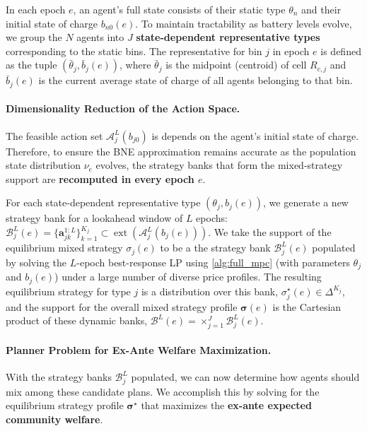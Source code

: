 \documentclass[12pt, notitlepage]{article}
\begin{document}
In each epoch $e$, an agent's full state consists of their static type $\theta_n$ and their initial state of charge $b_{n0}(e)$. To maintain tractability as battery levels evolve, we group the $N$ agents into $J$ \textbf{state-dependent representative types} corresponding to the static bins. The representative for bin $j$ in epoch $e$ is defined as the tuple $(\bar{\theta}_j, \bar{b}_j(e))$, where $\bar{\theta}_j$ is the midpoint (centroid) of cell $R_{c,j}$ and $\bar{b}_j(e)$ is the current average state of charge of all agents belonging to that bin.

\paragraph{Dimensionality Reduction of the Action Space.}
The feasible action set $\mathcal{A}_j^L(b_{j0})$ is depends on the agent's initial state of charge. Therefore, to ensure the BNE approximation remains accurate as the population state distribution $\nu_e$ evolves, the strategy banks that form the mixed-strategy support are \textbf{recomputed in every epoch $e$}. 

For each state-dependent representative type $(\theta_j, b_j(e))$, we generate a new strategy bank for a lookahead window of $L$ epochs: $\mathcal{B}_j^L(e) = \{\mathbf{a}_{jk}^{1:L}\}_{k=1}^{K_j} \subset \operatorname{ext}(\mathcal{A}_j^L(b_j(e)))$.
We take the support of the equilibrium mixed strategy $\sigma_j(e)$ to be a the strategy bank $\mathcal{B}_j^L(e)$ populated by solving the $L$-epoch best-response LP using \cref{alg:full_mpc} (with parameters $\theta_j$ and $b_j(e)$) under a large number of diverse price profiles. The resulting equilibrium strategy for type $j$ is a distribution over this bank, $\sigma_j^\star(e) \in \varDelta^{K_j}$, and the support for the overall mixed strategy profile $\boldsymbol{\sigma}(e)$ is the Cartesian product of these dynamic banks, $\mathcal{B}^L(e) = \times_{j=1}^J \mathcal{B}_j^L(e)$.



\paragraph{Planner Problem for Ex-Ante Welfare Maximization.}
With the strategy banks $\mathcal{B}_j^L$ populated, we can now determine how agents should mix among these candidate plans. We accomplish this by solving for the equilibrium strategy profile $\boldsymbol{\sigma}^\star$ that maximizes the \textbf{ex-ante expected community welfare}. 
\end{document}
